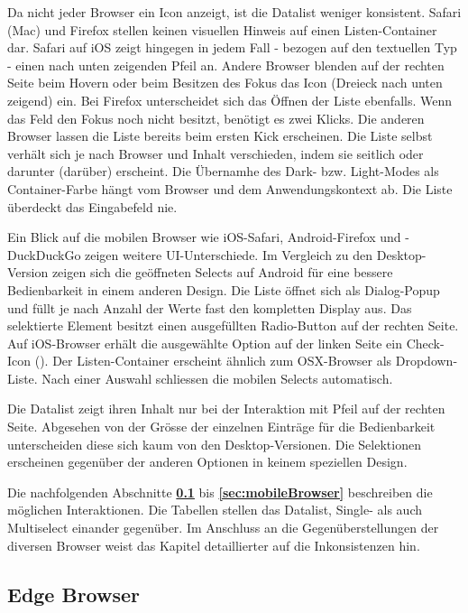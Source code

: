 Da nicht jeder Browser ein Icon anzeigt, ist die Datalist weniger konsistent.
Safari (Mac) und Firefox stellen keinen visuellen Hinweis auf einen Listen-Container dar.
Safari auf iOS zeigt hingegen in jedem Fall - bezogen auf den textuellen Typ - einen nach unten zeigenden Pfeil an.
Andere Browser blenden auf der rechten Seite beim Hovern oder beim Besitzen des Fokus das Icon (Dreieck nach unten zeigend) ein.
Bei Firefox unterscheidet sich das Öffnen der Liste ebenfalls. 
Wenn das Feld den Fokus noch nicht besitzt, benötigt es zwei Klicks.
Die anderen Browser lassen die Liste bereits beim ersten Kick erscheinen.
Die Liste selbst verhält sich je nach Browser und Inhalt verschieden, indem sie seitlich oder darunter (darüber) erscheint.
Die Übernamhe des Dark- bzw. Light-Modes als Container-Farbe hängt vom Browser und dem Anwendungskontext ab.
Die Liste überdeckt das Eingabefeld nie. 

Ein Blick auf die mobilen Browser wie iOS-Safari, Android-Firefox und -DuckDuckGo zeigen weitere UI-Unterschiede.
Im Vergleich zu den Desktop-Version zeigen sich die geöffneten Selects auf Android für eine bessere Bedienbarkeit in einem anderen Design.
Die Liste öffnet sich als Dialog-Popup und füllt je nach Anzahl der Werte fast den kompletten Display aus.
Das selektierte Element besitzt einen ausgefüllten Radio-Button auf der rechten Seite. 
Auf iOS-Browser erhält die ausgewählte Option auf der linken Seite ein Check-Icon (\cmark).
Der Listen-Container erscheint ähnlich zum OSX-Browser als Dropdown-Liste.
Nach einer Auswahl schliessen die mobilen Selects automatisch.

Die Datalist zeigt ihren Inhalt nur bei der Interaktion mit Pfeil auf der rechten Seite.
Abgesehen von der Grösse der einzelnen Einträge für die Bedienbarkeit unterscheiden diese sich kaum von den Desktop-Versionen.
Die Selektionen erscheinen gegenüber der anderen Optionen in keinem speziellen Design.

Die nachfolgenden Abschnitte \textbf{\ref{sec:edgeBrowser}} bis \textbf{\ref{sec:mobileBrowser}} beschreiben die möglichen Interaktionen.
Die Tabellen stellen das Datalist, Single- als auch Multiselect einander gegenüber.
Im Anschluss an die Gegenüberstellungen der diversen Browser weist das Kapitel \textbf{} detaillierter auf die Inkonsistenzen hin. 


\clearpage
\subsection{Edge Browser}
\label{sec:edgeBrowser}


